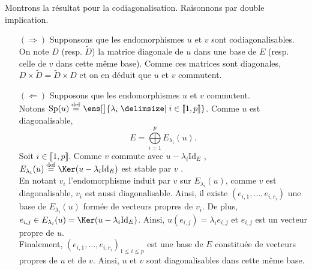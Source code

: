 \begin{preuve} 
    Montrons la résultat pour la codiagonalisation. Raisonnons par double implication.
    \begin{itemize}
        \item[$(\Rightarrow)$] Supponsons que les endomorphismes $u$ et $v$ sont codiagonalisables. On note $D$ (resp. $\widetilde{D}$) la matrice diagonale de $u$ dans une base de $E$ (resp. celle de $v$ dans cette même base). Comme ces matrices sont diagonales, $D \times \widetilde{D} = \widetilde{D} \times D$ \note {} et on en déduit que $u$ et $v$ commutent.
        \item[$(\Leftarrow)$] Supposons que les endomorphismes $u$ et $v$ commutent. \\ 
        Notons $\mathrm{Sp}(u) \defeq \ens[\big]{ \lambda_i \tq i \in \llbracket1, p \rrbracket }$. Comme $u$ est diagonalisable, 
        $$E = \bigoplus\limits_{i = 1}^{p} E_{\lambda_i}(u).$$
        Soit $i \in \llbracket 1, p \rrbracket$. Comme $v$ commute avec $u - \lambda_i \mathrm{Id}_E$ \note 
        , $E_{\lambda_i}(u) \defeq \Ker(u - \lambda_i \Id_E)$ est stable par $v$ \note. \\
        En notant $v_i$ l'endomorphisme induit par $v$ sur $E_{\lambda_i}(u)$, comme $v$ est diagonalisable, $v_i$ est aussi diagonalisable. Ainsi, il existe $(e_{i, 1}, \dots, e_{i, r_i})$ une base de $E_{\lambda_i}(u)$ formée de vecteurs propres de $v_i$. De plus, $e_{i, j} \in E_{\lambda_i}(u) = \Ker(u - \lambda_i \Id_E)$. Ainsi, $u(e_{i,j}) = \lambda_i e_{i,j}$ et $e_{i,j}$ est un vecteur propre de $u$. \\
        Finalement, $(e_{i, 1}, \dots, e_{i, r_i})_{1 \leqslant i \leqslant p}$ est une base de $E$ constituée de vecteurs propres de $u$ et de $v$. Ainsi, $u$ et $v$ sont diagonalisables dans cette même base. 
    \end{itemize}
\end{preuve}

